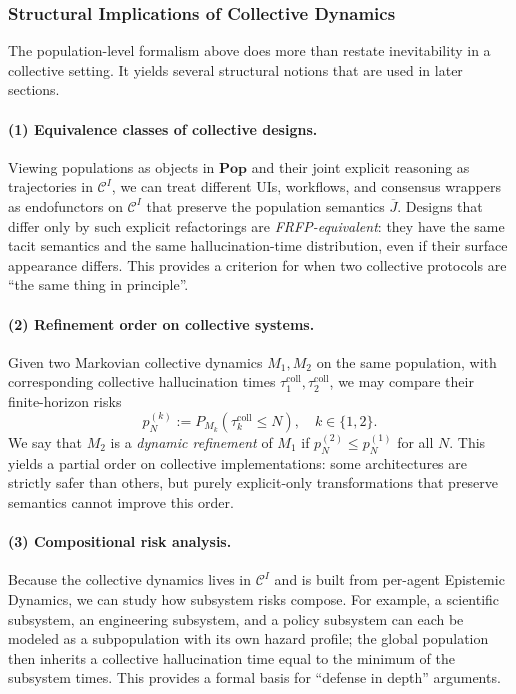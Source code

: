 \subsubsection{Structural Implications of Collective Dynamics}

The population-level formalism above does more than restate
inevitability in a collective setting. It yields several structural notions
that are used in later sections.

\paragraph{(1) Equivalence classes of collective designs.}
Viewing populations as objects in $\mathbf{Pop}$ and their joint explicit
reasoning as trajectories in $\mathcal{C}^I$, we can treat different UIs,
workflows, and consensus wrappers as endofunctors on $\mathcal{C}^I$ that
preserve the population semantics $\overline{J}$. Designs that differ only
by such explicit refactorings are \emph{FRFP-equivalent}: they have the same
tacit semantics and the same hallucination-time distribution, even if their
surface appearance differs. This provides a criterion for when two collective
protocols are ``the same thing in principle''.

\paragraph{(2) Refinement order on collective systems.}
Given two Markovian collective dynamics $M_1,M_2$ on the same population,
with corresponding collective hallucination times
$\tau^{\mathrm{coll}}_1,\tau^{\mathrm{coll}}_2$, we may compare their
finite-horizon risks
\[
  p_N^{(k)} := P_{M_k}(\tau^{\mathrm{coll}}_k \le N), \quad k\in\{1,2\}.
\]
We say that $M_2$ is a \emph{dynamic refinement} of $M_1$ if
$p_N^{(2)} \le p_N^{(1)}$ for all $N$. This yields a partial order on
collective implementations: some architectures are strictly safer than
others, but purely explicit-only transformations that preserve semantics
cannot improve this order.

\paragraph{(3) Compositional risk analysis.}
Because the collective dynamics lives in $\mathcal{C}^I$ and is built from
per-agent Epistemic Dynamics, we can study how subsystem risks compose.
For example, a scientific subsystem, an engineering subsystem, and a policy
subsystem can each be modeled as a subpopulation with its own hazard profile;
the global population then inherits a collective hallucination time equal to
the minimum of the subsystem times. This provides a formal basis for
``defense in depth'' arguments.

